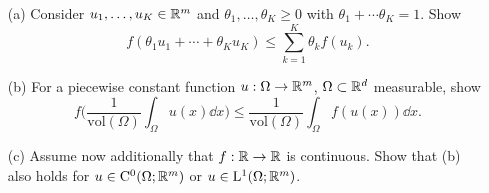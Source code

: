 \documentclass[12pt,a4paper]{article}
\begin{document}
\begin{itemize}
\item[(a)] Consider $u_1,\dots, u_K\in{\mathbb R}^m$
and $\theta_1,\dots,\theta_K\geq 0$ with $\theta_1+\cdots
\theta_K=1$. Show
\[
f(\theta_1u_1{+}\cdots {+}\theta_Ku_K) \leq \sum_{k=1}^K \theta_k
f(u_k).
\]
\item[(b)] For a piecewise constant function $u:\Omega \to {\mathbb R}^m$, $\Omega\subset{\mathbb R}^d$ measurable, show 
\[
f\Big(\frac1{\text{vol}(\Omega)} \int_\Omega u(x)\dd x \Big)  \leq 
\frac1{\text{vol}(\Omega)} \int_\Omega f(u(x)) \dd x.
\]
\item[(c)] 
Assume now additionally that $f:{\mathbb R}\to {\mathbb R}$ is continuous. Show that (b)
also holds for $u\in {\mathrm C}^0(\Omega;{\mathbb R}^m)$ or $u\in{\mathrm L}^1(\Omega;{\mathbb R}^m)$.  
\end{itemize}
\end{document}
